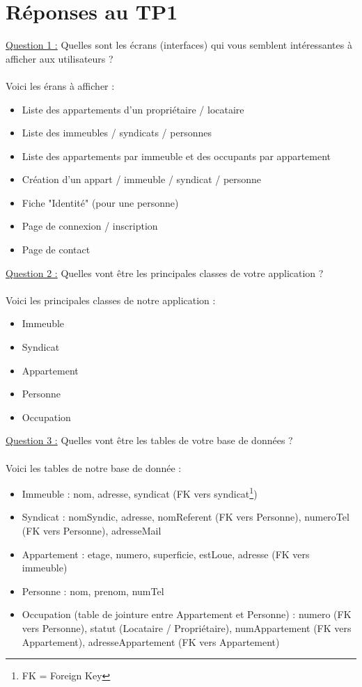\documentclass[french]{article}
\begin{document}
\section{Réponses au TP1}
\underline{Question 1 :} Quelles sont les écrans (interfaces) qui vous semblent intéressantes à afficher aux utilisateurs ? \\ \\
Voici les érans à afficher :
\begin{itemize}
\item Liste des appartements d'un propriétaire / locataire
\item Liste des immeubles / syndicats / personnes
\item Liste des appartements par immeuble et des occupants par appartement
\item Création d'un appart / immeuble / syndicat / personne
\item Fiche "Identité" (pour une personne)
\item Page de connexion / inscription
\item Page de contact \\
\end{itemize}

\underline{Question 2 :} Quelles vont être les principales classes de votre application ? \\ \\
Voici les principales classes de notre application :
\begin{itemize}
\item Immeuble
\item Syndicat
\item Appartement
\item Personne
\item Occupation \\
\end{itemize}

\underline{Question 3 :} Quelles vont être les tables de votre base de données ? \\ \\
Voici les tables de notre base de donnée :
\begin{itemize}
\item Immeuble : nom, adresse, syndicat (FK vers syndicat\footnote{FK = Foreign Key})
\item Syndicat : nomSyndic, adresse, nomReferent (FK vers Personne), numeroTel (FK vers Personne), adresseMail
\item Appartement : etage, numero, superficie, estLoue, adresse (FK vers immeuble)
\item Personne : nom, prenom, numTel
\item Occupation (table de jointure entre Appartement et Personne) : numero (FK vers Personne), statut (Locataire / Propriétaire), numAppartement (FK vers Appartement), adresseAppartement (FK vers Appartement) \\
\end{itemize}
\end{document}
